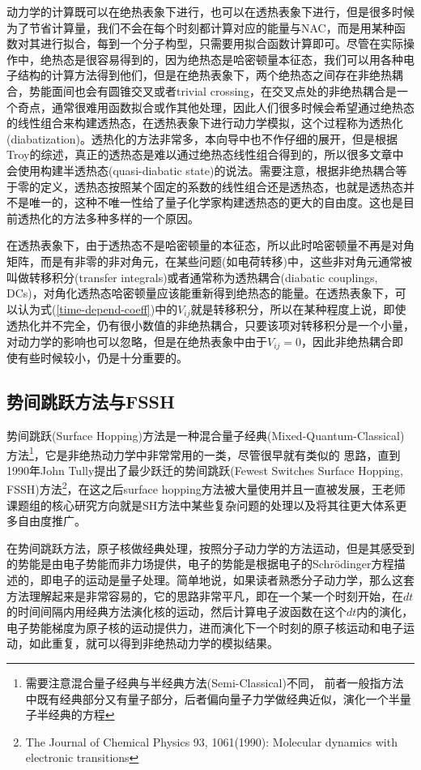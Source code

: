 \documentclass{article}
\numberwithin{equation}{section}
\begin{document}
        动力学的计算既可以在绝热表象下进行，也可以在透热表象下进行，但是很多时候为了节省计算量，我们不会在每个时刻都计算对应的能量与NAC，而是用某种函数对其进行拟合，每到一个分子构型，只需要用拟合函数计算即可。尽管在实际操作中，绝热态是很容易得到的，因为绝热态是哈密顿量本征态，我们可以用各种电子结构的计算方法得到他们，但是在绝热表象下，两个绝热态之间存在非绝热耦合，势能面间也会有圆锥交叉或者trivial crossing，在交叉点处的非绝热耦合是一个奇点，通常很难用函数拟合或作其他处理，因此人们很多时候会希望通过绝热态的线性组合来构建透热态，在透热表象下进行动力学模拟，这个过程称为透热化(diabatization)。透热化的方法非常多，本向导中也不作仔细的展开，但是根据Troy的综述，真正的透热态是难以通过绝热态线性组合得到的，所以很多文章中会使用构建半透热态(quasi-diabatic state)的说法。需要注意，根据非绝热耦合等于零的定义，透热态按照某个固定的系数的线性组合还是透热态，也就是透热态并不是唯一的，这种不唯一性给了量子化学家构建透热态的更大的自由度。这也是目前透热化的方法多种多样的一个原因。

        在透热表象下，由于透热态不是哈密顿量的本征态，所以此时哈密顿量不再是对角矩阵，而是有非零的非对角元，在某些问题(如电荷转移)中，这些非对角元通常被叫做转移积分(transfer integrals)或者通常称为透热耦合(diabatic couplings, DCs)，对角化透热态哈密顿量应该能重新得到绝热态的能量。在透热表象下，可以认为式(\ref{time-depend-coeff})中的$V_{ij}$就是转移积分，所以在某种程度上说，即使透热化并不完全，仍有很小数值的非绝热耦合，只要该项对转移积分是一个小量，对动力学的影响也可以忽略，但是在绝热表象中由于$V_{ij}=0$，因此非绝热耦合即使有些时候较小，仍是十分重要的。
      \subsection{势间跳跃方法与FSSH}
        势间跳跃(Surface Hopping)方法是一种混合量子经典(Mixed-Quantum-Classical)方法\footnote{需要注意混合量子经典与半经典方法(Semi-Classical)不同，
        前者一般指方法中既有经典部分又有量子部分，后者偏向量子力学做经典近似，演化一个半量子半经典的方程}，它是非绝热动力学中非常常用的一类，尽管很早就有类似的
        思路，直到1990年John Tully提出了最少跃迁的势间跳跃(Fewest Switches Surface Hopping, FSSH)方法\footnote{The Journal of Chemical Physics 93, 1061(1990): Molecular dynamics with electronic transitions}，在这之后surface hopping方法被大量使用并且一直被发展，王老师课题组的核心研究方向就是SH方法中某些复杂问题的处理以及将其往更大体系更多自由度推广。

        在势间跳跃方法，原子核做经典处理，按照分子动力学的方法运动，但是其感受到的势能是由电子势能而非力场提供，电子的势能是根据电子的Schr\"odinger方程描述的，即电子的运动是量子处理。简单地说，如果读者熟悉分子动力学，那么这套方法理解起来是非常容易的，它的思路非常平凡，即在一个某一个时刻开始，在$dt$的时间间隔内用经典方法演化核的运动，然后计算电子波函数在这个$dt$内的演化，电子势能梯度为原子核的运动提供力，进而演化下一个时刻的原子核运动和电子运动，如此重复，就可以得到非绝热动力学的模拟结果。
\end{document}
